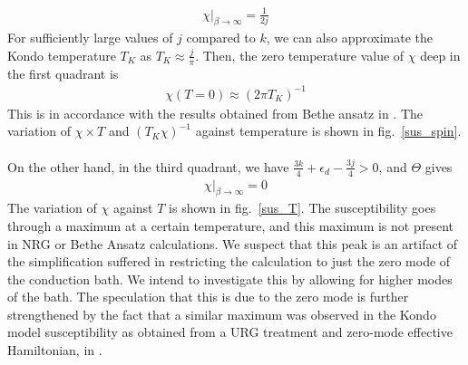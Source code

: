 \documentclass[twoside,11pt]{report}
\numberwithin{equation}{section}
\begin{document}
\begin{equation}\begin{aligned}
	\chi\vert_{\beta \to \infty} = \frac{1}{2j}
\end{aligned}\end{equation}
For sufficiently large values of \(j\) compared to \(k\), we can also approximate the Kondo temperature \(T_K\) as \(T_K \approx \frac{j}{\pi}\). Then, the zero temperature value of \(\chi\) deep in the first quadrant is
\begin{equation}\begin{aligned}
	\chi(T = 0) \approx \left(2 \pi T_K\right)^{-1}
\end{aligned}\end{equation}
This is in accordance with the results obtained from Bethe ansatz in \cite{okiji_kawakami}. The variation of \(\chi \times T\) and \(\left(T_K \chi\right)^{-1}\) against temperature is shown in fig.~\ref{sus_spin}.
\\\\On the other hand, in the third quadrant, we have \(\frac{3k}{4} + \epsilon_d - \frac{3j}{4} > 0\), and \(\Theta\) gives
\begin{equation}\begin{aligned}
	\chi\vert_{\beta \to \infty} = 0
\end{aligned}\end{equation}
The variation of \(\chi\) against \(T\) is shown in fig.~\ref{sus_T}. The susceptibility goes through a maximum at a certain temperature, and this maximum is not present in NRG or Bethe Ansatz calculations. We suspect that this peak is an artifact of the simplification suffered in restricting the calculation to just the zero mode of the conduction bath. We intend to investigate this by allowing for higher modes of the bath. The speculation that this is due to the zero mode is further strengthened by the fact that a similar maximum was observed in the Kondo model susceptibility as obtained from a URG treatment and zero-mode effective Hamiltonian, in \cite{am_thesis}.
\end{document}
